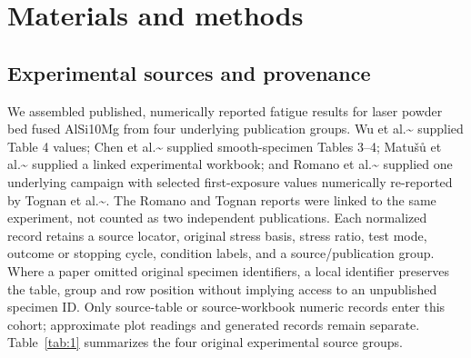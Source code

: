 \documentclass[12pt,a4paper]{article}
\begin{document}
\section{Materials and methods}

\subsection{Experimental sources and provenance}

We assembled published, numerically reported fatigue results for laser powder bed fused AlSi10Mg from four underlying publication groups. Wu et al.\textasciitilde{}\cite{wu2021} supplied Table 4 values; Chen et al.\textasciitilde{}\cite{chen2024} supplied smooth-specimen Tables 3–4; Matušů et al.\textasciitilde{}\cite{matusu2026} supplied a linked experimental workbook; and Romano et al.\textasciitilde{}\cite{romano2018} supplied one underlying campaign with selected first-exposure values numerically re-reported by Tognan et al.\textasciitilde{}\cite{tognan2023}. The Romano and Tognan reports were linked to the same experiment, not counted as two independent publications. Each normalized record retains a source locator, original stress basis, stress ratio, test mode, outcome or stopping cycle, condition labels, and a source/publication group. Where a paper omitted original specimen identifiers, a local identifier preserves the table, group and row position without implying access to an unpublished specimen ID. Only source-table or source-workbook numeric records enter this cohort; approximate plot readings and generated records remain separate. Table~\ref{tab:1} summarizes the four original experimental source groups.
\end{document}
